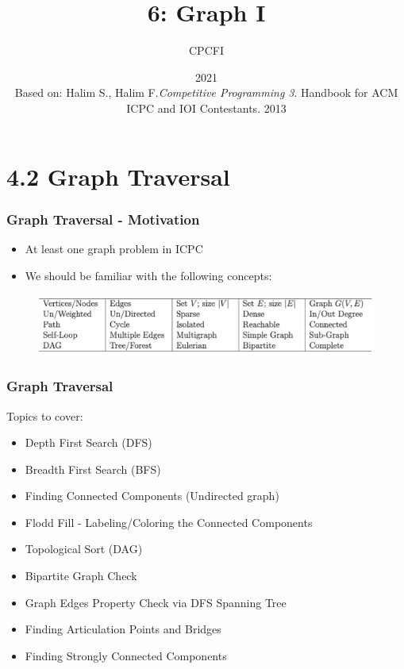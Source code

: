 \documentclass{beamer}
\title{6: Graph I}
\author{CPCFI}
\institute{UNAM's School of Engineering}
\date{2021 \\ \vspace{0.5cm} \scriptsize{Based on: Halim S., Halim F.\textit{Competitive Programming 3}}. Handbook for ACM ICPC and IOI Contestants. 2013}
\begin{document}
\frame{\titlepage}


\section{4.2 Graph Traversal}

\begin{frame}[fragile]
\frametitle{Graph Traversal - Motivation}

\begin{itemize}
    \item At least one graph problem in ICPC
    \item We should be familiar with the following concepts:
\end{itemize}

\vspace{0.3cm}

\begin{figure}
    \centering
    \includegraphics[scale=0.5]{imgs/important_graph_terminologies.png}
\end{figure}

\end{frame}

\begin{frame}[fragile]
\frametitle{Graph Traversal}

Topics to cover:

\begin{itemize}
    \item Depth First Search (DFS)
    \item Breadth First Search (BFS)
    \item Finding Connected Components (Undirected graph)
    \item Flodd Fill - Labeling/Coloring the Connected Components
    \item Topological Sort (DAG)
    \item Bipartite Graph Check
    \item Graph Edges Property Check via DFS Spanning Tree
    \item Finding Articulation Points and Bridges
    \item Finding Strongly Connected Components
\end{itemize}
  
\end{frame}
\end{document}
